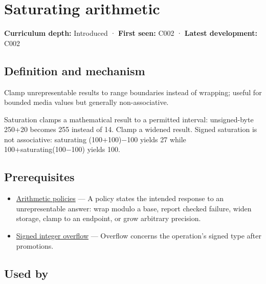 \hypertarget{appendix-3999c6209649}{}\label{referencestart:appendix-3999c6209649}
\section{Saturating arithmetic}\label{appendix-3999c6209649-saturating-arithmetic}

\textbf{Curriculum depth:} Introduced · \textbf{First seen:} C002 · \textbf{Latest development:} C002

\begin{allmightroledefinition}

\subsection{Definition and mechanism}\label{appendix-3999c6209649-definition-and-mechanism}

Clamp unrepresentable results to range boundaries instead of wrapping; useful for bounded media values but generally non-associative.

\end{allmightroledefinition}

Saturation clamps a mathematical result to a permitted interval: unsigned-byte 250+20 becomes 255 instead of 14. Clamp a widened result. Signed saturation is not associative: saturating (100+100)−100 yields 27 while 100+saturating(100−100) yields 100.

\subsection{Prerequisites}\label{appendix-3999c6209649-prerequisites}

\begin{itemize}
\tightlist
\item
  \hyperref[appendix-2ed044358b82]{Arithmetic policies} --- A policy states the intended response to an unrepresentable answer: wrap modulo a base, report checked failure, widen storage, clamp to an endpoint, or grow arbitrary precision.
\item
  \hyperref[appendix-1a599c924a4e]{Signed integer overflow} --- Overflow concerns the operation's signed type after promotions.
\end{itemize}

\subsection{Used by}\label{appendix-3999c6209649-used-by}

